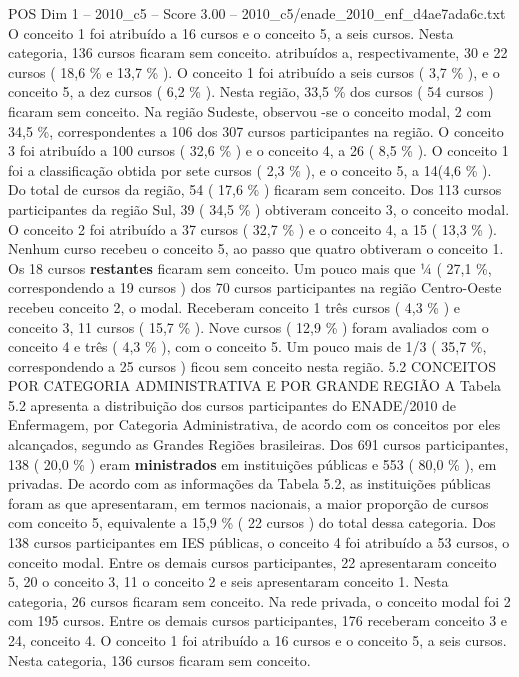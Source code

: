 \begin{textsample}{POS Dim 1 – 2010\_c5 – Score 3.00 – 2010\_c5/enade\_2010\_enf\_d4ae7ada6c.txt}
O conceito 1 foi atribuído a 16 cursos e o conceito 5, a seis cursos.
Nesta categoria, 136 cursos ficaram sem conceito. atribuídos a, respectivamente, 30 e 22 cursos ( 18,6 \% e 13,7 \% ).
O conceito 1 foi atribuído a seis cursos ( 3,7 \% ), e o conceito 5, a dez cursos ( 6,2 \% ).
Nesta região, 33,5 \% dos cursos ( 54 cursos ) ficaram sem conceito.
Na região Sudeste, observou -se o conceito modal, 2 com 34,5 \%, correspondentes a 106 dos 307 cursos participantes na região.
O conceito 3 foi atribuído a 100 cursos ( 32,6 \% ) e o conceito 4, a 26 ( 8,5 \% ).
O conceito 1 foi a classificação obtida por sete cursos ( 2,3 \% ), e o conceito 5, a 14(4,6 \% ).
Do total de cursos da região, 54 ( 17,6 \% ) ficaram sem conceito.
Dos 113 cursos participantes da região Sul, 39 ( 34,5 \% ) obtiveram conceito 3, o conceito modal.
O conceito 2 foi atribuído a 37 cursos ( 32,7 \% ) e o conceito 4, a 15 ( 13,3 \% ).
Nenhum curso recebeu o conceito 5, ao passo que quatro obtiveram o conceito 1.
Os 18 cursos \textbf{restantes} ficaram sem conceito.
Um pouco mais que ¼ ( 27,1 \%, correspondendo a 19 cursos ) dos 70 cursos participantes na região Centro-Oeste recebeu conceito 2, o modal.
Receberam conceito 1 três cursos ( 4,3 \% ) e conceito 3, 11 cursos ( 15,7 \% ).
Nove cursos ( 12,9 \% ) foram avaliados com o conceito 4 e três ( 4,3 \% ), com o conceito 5.
Um pouco mais de 1/3 ( 35,7 \%, correspondendo a 25 cursos ) ficou sem conceito nesta região. 5.2 CONCEITOS POR CATEGORIA ADMINISTRATIVA E POR GRANDE REGIÃO A Tabela 5.2 apresenta a distribuição dos cursos participantes do ENADE/2010 de Enfermagem, por Categoria Administrativa, de acordo com os conceitos por eles alcançados, segundo as Grandes Regiões brasileiras.
Dos 691 cursos participantes, 138 ( 20,0 \% ) eram \textbf{ministrados} em instituições públicas e 553 ( 80,0 \% ), em privadas.
De acordo com as informações da Tabela 5.2, as instituições públicas foram as que apresentaram, em termos nacionais, a maior proporção de cursos com conceito 5, equivalente a 15,9 \% ( 22 cursos ) do total dessa categoria.
Dos 138 cursos participantes em IES públicas, o conceito 4 foi atribuído a 53 cursos, o conceito modal.
Entre os demais cursos participantes, 22 apresentaram conceito 5, 20 o conceito 3, 11 o conceito 2 e seis apresentaram conceito 1.
Nesta categoria, 26 cursos ficaram sem conceito.
Na rede privada, o conceito modal foi 2 com 195 cursos.
Entre os demais cursos participantes, 176 receberam conceito 3 e 24, conceito 4.
O conceito 1 foi atribuído a 16 cursos e o conceito 5, a seis cursos.
Nesta categoria, 136 cursos ficaram sem conceito.

\end{textsample}
